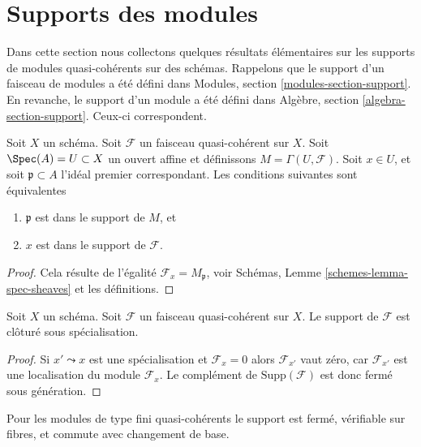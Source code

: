 \section{Supports des modules}
\label{section-support}

\noindent
Dans cette section nous collectons quelques résultats élémentaires
sur les supports de modules quasi-cohérents
sur des schémas. Rappelons que le support d'un faisceau
de modules a été défini dans Modules, section \ref{modules-section-support}.
En revanche, le support d'un module a été défini
dans Algèbre, section \ref{algebra-section-support}. Ceux-ci
correspondent.

\begin{lemma}
\label{lemma-support-affine-open}
Soit $X$ un schéma. Soit $\mathcal{F}$ un faisceau quasi-cohérent sur
$X$. Soit $\Spec(A) = U \subset X$ un ouvert affine et définissons
$M = \Gamma(U, \mathcal{F})$. Soit $x \in U$,
et soit $\mathfrak p \subset A$ l'idéal premier correspondant. Les conditions suivantes
sont équivalentes
\begin{enumerate}
\item $\mathfrak p$ est dans le support de $M$, et
\item $x$ est dans le support de $\mathcal{F}$.
\end{enumerate}
\end{lemma}

\begin{proof}
Cela résulte de l'égalité $\mathcal{F}_x = M_{\mathfrak p}$, voir Schémas,
Lemme \ref{schemes-lemma-spec-sheaves} et les
définitions.
\end{proof}

\begin{lemma}
\label{lemma-support-closed-specialization}
Soit $X$ un schéma.
Soit $\mathcal{F}$ un faisceau quasi-cohérent sur $X$.
Le support de $\mathcal{F}$ est clôturé sous spécialisation.
\end{lemma}

\begin{proof}
Si $x' \leadsto x$ est une spécialisation et $\mathcal{F}_x = 0$
alors $\mathcal{F}_{x'}$ vaut zéro, car $\mathcal{F}_{x'}$ est une localisation
du module $\mathcal{F}_x$. Le complément
de $\text{Supp}(\mathcal{F})$ est donc fermé sous génération.
\end{proof}

\noindent
Pour les modules de type fini quasi-cohérents le support est fermé,
vérifiable sur fibres, et commute avec changement de base.

